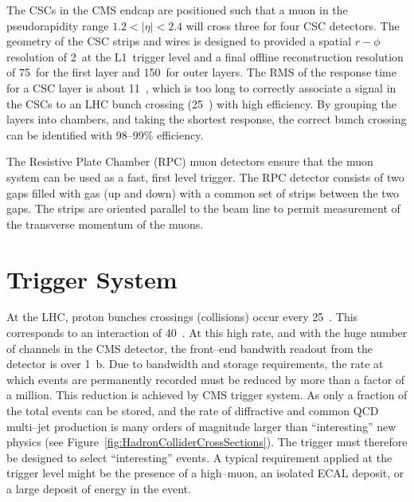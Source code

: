 The CSCs in the CMS endcap are positioned such that a muon in the pseudorapidity
range $1.2 < |\eta| < 2.4$ will cross three for four CSC detectors.  The
geometry of the CSC strips and wires is designed to provided a spatial $r-\phi$
resolution of 2~\milli\meter at the L1~trigger level and a final offline
reconstruction resolution of 75~\micro\meter for the first layer and
150~\micro\meter for outer layers.  The RMS of the response time for a CSC layer
is about 11~\nano\second, which is too long to correctly associate a signal in
the CSCs to an LHC bunch crossing (25~\nano\second) with high efficiency.  By
grouping the layers into chambers, and taking the shortest response, the correct
bunch crossing can be identified with \mbox{98--99\%} efficiency.

The Resistive Plate Chamber (RPC) muon detectors ensure that the muon system can
be used as a fast, first level trigger.  The RPC detector consists of two gaps
filled with gas (up and down) with a common set of strips between the two gaps.
The strips are oriented parallel to the beam line to permit measurement of the
transverse momentum of the muons.

\section{Trigger System}

At the LHC, proton bunches crossings (collisions) occur every 25~\nano\second.
This corresponds to an interaction of 40~\mega\hertz.  At this high rate, and
with the huge number of channels in the CMS detector, the front--end bandwith
readout from the detector is over 1~\peta b\per\second.  Due to bandwidth and
storage requirements, the rate at which events are permanently recorded must be
reduced by more than a factor of a million. This reduction is achieved by CMS
trigger system.  As only a fraction of the total events can be stored, and the
rate of diffractive and common QCD multi--jet production is many orders of
magnitude larger than ``interesting'' new physics (see
Figure~\ref{fig:HadronColliderCrossSections}).  The trigger must therefore be
designed to select ``interesting'' events.  A typical requirement applied at the
trigger level might be the presence of a high--\pt muon, an isolated ECAL
deposit, or a large deposit of energy in the event.

